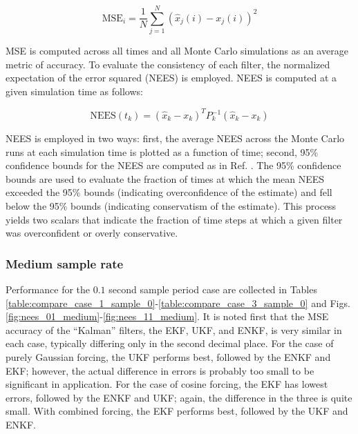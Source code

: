 \documentclass[]{article}
\begin{document}
\begin{equation}
\mathrm{MSE}_i = \frac{1}{N} \sum_{j=1}^N (\hat{x}_j(i) - x_j(i))^2
\end{equation}

MSE is computed across all times and all Monte Carlo simulations as an average metric of accuracy. To evaluate the consistency of each filter, the normalized expectation of the error squared (NEES) is employed. NEES is computed at a given simulation time as follows:

\begin{equation}
\mathrm{NEES}(t_k) = (\hat{x}_k-x_k)^T P_k^{-1} (\hat{x}_k-x_k)
\end{equation}

NEES is employed in two ways: first, the average NEES across the Monte Carlo runs at each simulation time is plotted as a function of time; second, 95\% confidence bounds for the NEES are computed as in Ref. \cite{neesPaper}. The 95\% confidence bounds are used to evaluate the fraction of times at which the mean NEES exceeded the 95\% bounds (indicating overconfidence of the estimate) and fell below the 95\% bounds (indicating conservatism of the estimate). This process yields two scalars that indicate the fraction of time steps at which a given filter was overconfident or overly conservative.

\subsubsection{Medium sample rate}

Performance for the $0.1$ second sample period case are collected in Tables \ref{table:compare_case_1_sample_0}-\ref{table:compare_case_3_sample_0} and Figs. \ref{fig:nees_01_medium}-\ref{fig:nees_11_medium}. It is noted first that the MSE accuracy of the ``Kalman'' filters, the EKF, UKF, and ENKF, is very similar in each case, typically differing only in the second decimal place. For the case of purely Gaussian forcing, the UKF performs best, followed by the ENKF and EKF; however, the actual difference in errors is probably too small to be significant in application. For the case of cosine forcing, the EKF has lowest errors, followed by the ENKF and UKF; again, the difference in the three is quite small. With combined forcing, the EKF performs best, followed by the UKF and ENKF.
\end{document}
